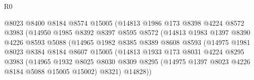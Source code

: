 \begin{lexlean}{R0}
\begin{coremodule}
                                  @8023
                                  @8400
                                  @8184
                                  @8574
                                  @15005
                                  (@14813
                                    @1986
                                    @173
                                    @8398
                                    @4224
                                    @8572
                                    @3983
                                    (@14950
                                      @1985
                                      @8392
                                      @8397
                                      @8595
                                      @8572
                                      (@14813
                                        @1983
                                        @1397
                                        @8390
                                        @4226
                                        @8593
                                        @5088
                                        (@14965
                                          @1982
                                          @8385
                                          @8389
                                          @8608
                                          @8593
                                          (@14975
                                            @1981
                                            @8023
                                            @8384
                                            @8184
                                            @8607
                                            @15005
                                            (@14813
                                              @1933
                                              @173
                                              @8031
                                              @4224
                                              @8295
                                              @3983
                                              (@14965
                                                @1932
                                                @8025
                                                @8030
                                                @8309
                                                @8295
                                                (@14975 @1397 @8023 @4226 @8184 @5088 @15005 @15002)
                                                @8321)
                                              @14828))

\end{coremodule}
\end{lexlean}
